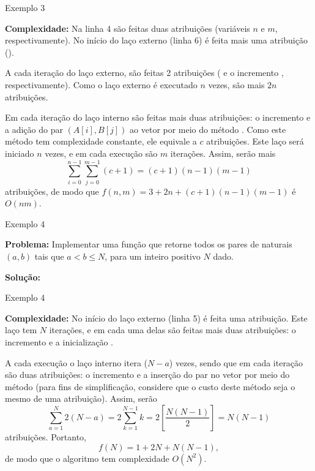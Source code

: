 \begin{frame}[fragile]{Exemplo 3}

    {\bf Complexidade: } Na linha 4 são feitas duas atribuições (variáveis $n$ e $m$, 
        respectivamente). No início do laço externo (linha 6) é feita mais uma atribuição
        ().

        A cada iteração do laço externo, são feitas 2 atribuições ( e o 
        incremento , respectivamente). Como o laço externo é executado $n$ vezes, 
        são mais $2n$ atribuições.

        Em cada iteração do laço interno são feitas mais duas atribuições: o incremento 
         e a adição do par $(A[i], B[j])$ ao vetor  por meio do método
        . Como este método tem complexidade constante, ele equivale a 
        $c$ atribuições. Este laço será iniciado $n$ vezes, e em cada execução são $m$ iterações.
        Assim, serão mais
        \[
            \sum_{i = 0}^{n - 1}\sum_{j = 0}^{m - 1} (c + 1) = (c + 1)(n - 1)(m - 1)
        \]
        atribuições, de modo que $f(n, m) = 3 + 2n + (c + 1)(n - 1)(m - 1)$ é $O(nm)$.
\end{frame}

\begin{frame}[fragile]{Exemplo 4}

    {\bf Problema:} Implementar uma função que retorne todos os pares de naturais $(a, b)$ tais
        que $a < b \leq N$, para um inteiro positivo $N$ dado.
	\vspace{0.1in}

    {\bf Solução:} 
    \vspace{0.2in}

\end{frame}

\begin{frame}[fragile]{Exemplo 4}
    
    \textbf{Complexidade:} No início do laço externo (linha 5) é feita uma atribuição. Este
    laço tem $N$ iterações, e em cada uma delas são feitas mais duas atribuições: o incremento
     e a inicialização .

    A cada execução o laço interno itera ($N - a$) vezes, sendo que em cada iteração são duas
    atribuições: o incremento  e a inserção do par no vetor por meio do
    método  (para fins de simplificação, considere que o custo deste método
    seja o mesmo de uma atribuição). Assim, serão
    \[
        \sum_{a = 1}^N 2(N - a) = 2\sum_{k = 1}^{N - 1} k = 2\left[\frac{N(N - 1)}{2}\right] 
            = N(N - 1)
    \]
    atribuições.  Portanto,
    \[
        f(N) = 1 + 2N + N(N - 1),
    \]
    de modo que o algoritmo tem complexidade $O(N^2)$.
    
\end{frame}


